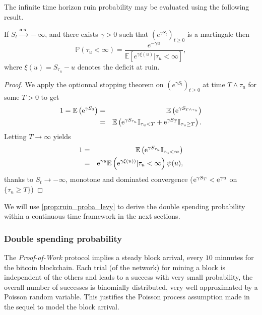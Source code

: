 The infinite time horizon ruin probability may be evaluated using the following result.
\begin{prop}\label{prop:ruin_proba_levy}
If $S_t\overset{\textbf{a.s.}}{\rightarrow} -\infty$, and there exists $\gamma>0$ such that $\left(e^{\gamma S_t}\right)_{t\geq0}$ is a martingale then
$$
\mathbb{P}(\tau_u<\infty)=\frac{e^{-\gamma u}}{\mathbb{E}\left[e^{\gamma \xi(u)}|\tau_u<\infty\right]},
$$
where $\xi(u)=S_{\tau_u}-u$ denotes the deficit at ruin.
\end{prop}
\begin{proof}
We apply the optionnal stopping theorem on $(e^{\gamma S_t})_{t\geq0}$ at time $T\land \tau_u$ for some $T>0$ to get 
\begin{eqnarray*}
1 = \mathbb{E}\left(\mathrm{e}^{\gamma S_0}\right)&=& \mathbb{E}\left(\mathrm{e}^{\gamma S_{T\land \tau_u}}\right)\\  
&=& \mathbb{E}\left(\mathrm{e}^{\gamma S_{\tau_u}}\mathbb{I}_{\tau_u<T} + \mathrm{e}^{\gamma S_{T}}\mathbb{I}_{\tau_u\geq T}\right).\\
\end{eqnarray*} 
Letting $T\rightarrow\infty$  yields
\begin{eqnarray*}
1 &=&\mathbb{E}\left(\mathrm{e}^{\gamma S_{\tau_u}}\mathbb{I}_{\tau_u<\infty}\right)\\
&=&\mathrm{e}^{\gamma u}\mathbb{E}\left(\mathrm{e}^{\gamma \xi(u))}|\tau_u<\infty\right)\psi(u),
\end{eqnarray*} 
thanks to $S_t\rightarrow -\infty$, monotone and dominated convergence ($\mathrm{e}^{\gamma S_{T}}<\mathrm{e}^{\gamma u}$ on $\{\tau_u\geq T\}$)
\end{proof}
We will use \cref{prop:ruin_proba_levy} to derive the double spending probability within a continuous time framework in the next sections.
\subsubsection{Double spending probability}\label{sssec:double_spending_counting_process_dsp}
The \textit{Proof-of-Work} protocol implies a steady block arrival, every $10$ minnutes for the bitcoin blockchain. Each trial (of the network) for mining a block is independent of the others and leads to a success with very small probability, the overall number of successes is binomially distributed, very well approximated by a
Poisson random variable. This justifies the Poisson process assumption made in the sequel to model the block arrival.\\

